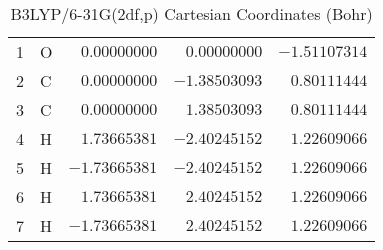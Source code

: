 \documentclass[10pt,oneside]{article}
\begin{document}
\begin{table}[h]
\centering
\caption{B3LYP/6-31G(2df,p) Cartesian Coordinates (Bohr)}
\begin{tabular}{llrrr}
\toprule
1  & O  & $ 0.00000000$ & $ 0.00000000$ & $-1.51107314$ \\
2  & C  & $ 0.00000000$ & $-1.38503093$ & $ 0.80111444$ \\
3  & C  & $ 0.00000000$ & $ 1.38503093$ & $ 0.80111444$ \\
4  & H  & $ 1.73665381$ & $-2.40245152$ & $ 1.22609066$ \\
5  & H  & $-1.73665381$ & $-2.40245152$ & $ 1.22609066$ \\
6  & H  & $ 1.73665381$ & $ 2.40245152$ & $ 1.22609066$ \\
7  & H  & $-1.73665381$ & $ 2.40245152$ & $ 1.22609066$ \\
\bottomrule
\end{tabular}
\end{table}
\end{document}
